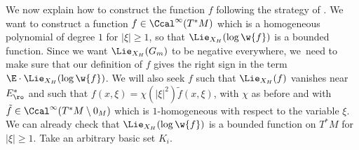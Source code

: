 We now explain how to construct the function $f$ following the strategy of \cite{FS,dyatlov-zworski}. We want to construct a function $f \in \Ccal^{\infty} (T^*M)$ which is a homogeneous polynomial of degree $1$ for $|\xi| \geq 1$, so that $\Lie_{X_H} (\log \w{f})$ is a bounded function. Since we want $\Lie_{X_H}(G_m)$ to be negative everywhere, we~need to make sure that our definition of $f$ gives the right sign in the term $\E \cdot\Lie_{X_H}(\log \w{f})$. We will also seek $f$ such that $\Lie_{X_H} (f)$ vanishes near $E_\ro^*$ and such that $f(x,\xi) = \chi (|\xi|^2) \tilde{f} (x,\xi)$, with $\chi$ as before and with $\tilde{f} \in \Ccal^{\infty}(T^* M \setminus 0_M)$ which is $1$-homogeneous with respect to the variable $\xi$. We can already check that $\Lie_{X_H} (\log \w{f})$ is a bounded function on $T^* M$ for $|\xi| \geq 1$. Take an arbitrary basic set $K_i$.
